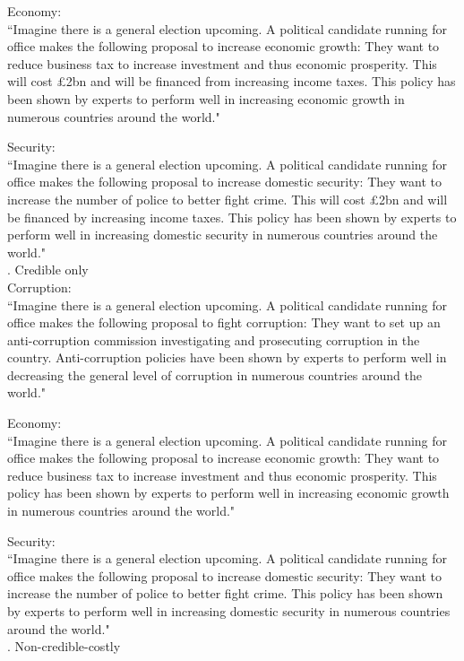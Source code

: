 \documentclass[11pt]{article}
\begin{document}
Economy:\\
“Imagine there is a general election upcoming. A political candidate running for office makes the following proposal to increase economic growth: They want to reduce business tax to increase investment and thus economic prosperity. This will cost £2bn and will be financed from increasing income taxes. This policy has been shown by experts to perform well in increasing economic growth in numerous countries around the world."

Security:\\
“Imagine there is a general election upcoming. A political candidate running for office makes the following proposal to increase domestic security: They want to increase the number of police to better fight crime. This will cost £2bn and will be financed by increasing income taxes. This policy has been shown by experts to perform well in increasing domestic security in numerous countries around the world."\\

. Credible only\\

Corruption:\\
“Imagine there is a general election upcoming. A political candidate running for office makes the following proposal to fight corruption: They want to set up an anti-corruption commission investigating and prosecuting corruption in the country. Anti-corruption policies have been shown by experts to perform well in decreasing the general level of corruption in numerous countries around the world."

Economy:\\
“Imagine there is a general election upcoming. A political candidate running for office makes the following proposal to increase economic growth: They want to reduce business tax to increase investment and thus economic prosperity. This policy has been shown by experts to perform well in increasing economic growth in numerous countries around the world."

Security:\\
“Imagine there is a general election upcoming. A political candidate running for office makes the following proposal to increase domestic security: They want to increase the number of police to better fight crime. This policy has been shown by experts to perform well in increasing domestic security in numerous countries around the world."\\


. Non-credible-costly\\
\end{document}

